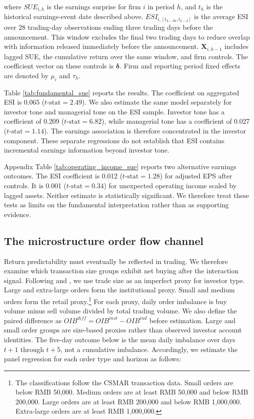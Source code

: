 \documentclass[12pt]{article}
\begin{document}
\noindent where $SUE_{i,h}$ is the earnings surprise for firm $i$ in period $h$, and $t_h$ is the historical earnings-event date described above. $ESI_{i,[t_{h-30},t_{h-3}]}$ is the average ESI over 28 trading-day observations ending three trading days before the announcement. This window excludes the final two trading days to reduce overlap with information released immediately before the announcement. $\mathbf{X}_{i,h-1}$ includes lagged SUE, the cumulative return over the same window, and firm controls. The coefficient vector on these controls is $\boldsymbol{\delta}$. Firm and reporting period fixed effects are denoted by $\mu_i$ and $\tau_h$.

Table \ref{tab:fundamental_sue} reports the results. The coefficient on aggregated ESI is 0.065 ($t\text{-stat}=2.49$). We also estimate the same model separately for investor tone and managerial tone on the ESI sample. Investor tone has a coefficient of 0.209 ($t\text{-stat}=6.82$), while managerial tone has a coefficient of 0.027 ($t\text{-stat}=1.14$). The earnings association is therefore concentrated in the investor component. These separate regressions do not establish that ESI contains incremental earnings information beyond investor tone.

Appendix Table \ref{tab:operating_income_sue} reports two alternative earnings outcomes. The ESI coefficient is 0.012 ($t\text{-stat}=1.28$) for adjusted EPS after controls. It is 0.001 ($t\text{-stat}=0.34$) for unexpected operating income scaled by lagged assets. Neither estimate is statistically significant. We therefore treat these tests as limits on the fundamental interpretation rather than as supporting evidence.

\subsection{The microstructure order flow channel}
\label{sec:microstructure_oib}

Return predictability must eventually be reflected in trading. We therefore examine which transaction size groups exhibit net buying after the interaction signal. Following \citet{lee1992} and \citet{tong2013}, we use trade size as an imperfect proxy for investor type. Large and extra-large orders form the institutional proxy. Small and medium orders form the retail proxy.\footnote{The classifications follow the CSMAR transaction data. Small orders are below RMB 50,000. Medium orders are at least RMB 50,000 and below RMB 200,000. Large orders are at least RMB 200,000 and below RMB 1,000,000. Extra-large orders are at least RMB 1,000,000.} For each proxy, daily order imbalance is buy volume minus sell volume divided by total trading volume. We also define the paired difference as $OIB^{diff}=OIB^{inst}-OIB^{ind}$ before estimation. Large and small order groups are size-based proxies rather than observed investor account identities. The five-day outcome below is the mean daily imbalance over days $t+1$ through $t+5$, not a cumulative imbalance. Accordingly, we estimate the panel regression for each order type and horizon as follows:
\end{document}
